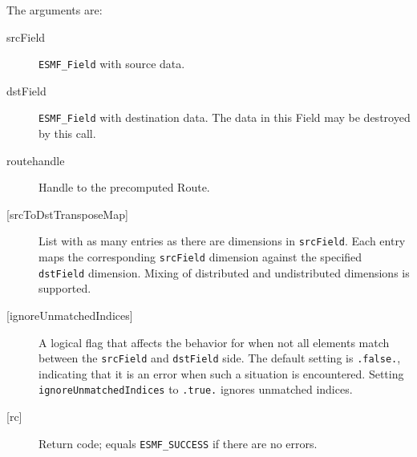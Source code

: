    The arguments are: 
   \begin{description} 
   \item [srcField]  
     {\tt ESMF\_Field} with source data. 
   \item [dstField] 
     {\tt ESMF\_Field} with destination data. The data in this Field may be
       destroyed by this call.
   \item [routehandle] 
     Handle to the precomputed Route. 
   \item [{[srcToDstTransposeMap]}] 
     List with as many entries as there are dimensions in {\tt srcField}. Each
     entry maps the corresponding {\tt srcField} dimension against the specified
     {\tt dstField} dimension. Mixing of distributed and undistributed
     dimensions is supported.
   \item [{[ignoreUnmatchedIndices]}]
     A logical flag that affects the behavior for when not all elements match
     between the {\tt srcField} and {\tt dstField} side. The default setting
     is {\tt .false.}, indicating that it is an error when such a situation is 
     encountered. Setting {\tt ignoreUnmatchedIndices} to {\tt .true.} ignores
     unmatched indices.
   \item [{[rc]}]  
     Return code; equals {\tt ESMF\_SUCCESS} if there are no errors. 
   \end{description} 
   
\setlength{\parskip}{\oldparskip}
\setlength{\parindent}{\oldparindent}
\setlength{\baselineskip}{\oldbaselineskip}
